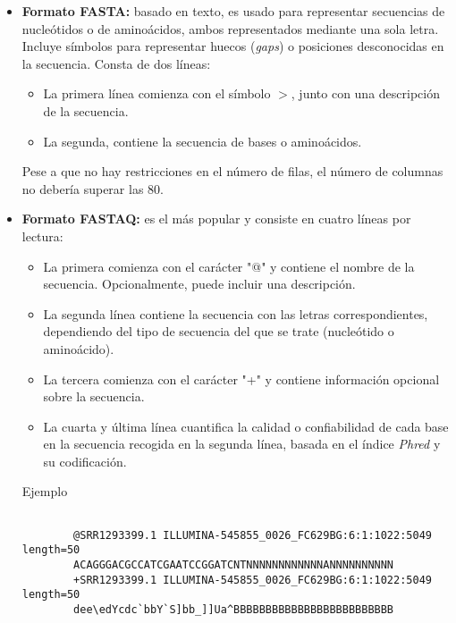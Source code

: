 \begin{itemize}
    \item \textbf{Formato FASTA:} basado en texto, es usado para representar secuencias de nucleótidos o de aminoácidos, ambos representados mediante una sola letra.
    Incluye símbolos para representar huecos (\textit{gaps}) o posiciones desconocidas en la secuencia. Consta de dos líneas:
    \begin{itemize}
        \item La primera línea comienza con el símbolo $>$, junto con una descripción de la secuencia.
        \item La segunda, contiene la secuencia de bases o aminoácidos. 
    \end{itemize}

    Pese a que no hay restricciones en el número de filas, el número de columnas no debería superar las $80$.
    
    \item \textbf{Formato FASTAQ:} es el más popular y consiste en cuatro líneas por lectura:
    \begin{itemize}
        \item La primera comienza con el carácter "@" y contiene el nombre de la secuencia. Opcionalmente, puede incluir una descripción.
        \item La segunda línea contiene la secuencia con las letras correspondientes, dependiendo del tipo de secuencia del que se trate (nucleótido o aminoácido).
        \item La tercera comienza con el carácter "+" y contiene información opcional sobre la secuencia.
        \item La cuarta y última línea cuantifica la calidad o confiabilidad de cada base en la secuencia recogida en la segunda línea, basada en el índice
        \textit{Phred} y su codificación. \newline
    \end{itemize}

    \begin{mybox}{Ejemplo}
        

        \begin{lstlisting}

        @SRR1293399.1 ILLUMINA-545855_0026_FC629BG:6:1:1022:5049 length=50
        ACAGGGACGCCATCGAATCCGGATCNTNNNNNNNNNNNNANNNNNNNNNN
        +SRR1293399.1 ILLUMINA-545855_0026_FC629BG:6:1:1022:5049 length=50
        dee\edYcdc`bbY`S]bb_]]Ua^BBBBBBBBBBBBBBBBBBBBBBBBB
            
        \end{lstlisting}
        
    \end{mybox}

\end{itemize}

